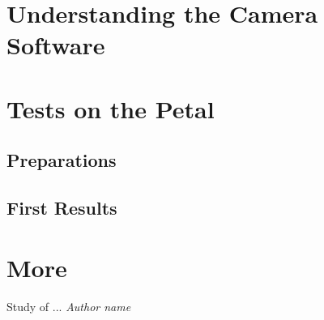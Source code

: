 \documentclass[12pt,oneside,notitlepage,abstracton,a4paper]{article}
\begin{document}
\section{Understanding the Camera Software}

\section{Tests on the Petal}
\subsection{Preparations}
\subsection{First Results}

\section{More}


\clearpage
\begin{thebibliography}{99}
\begin{sloppypar}
 Study of ...
{\em Author name}
\end{sloppypar}
\end{thebibliography}
\end{document}
